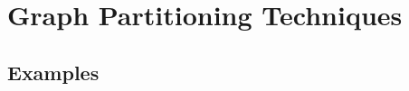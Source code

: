 \section{Graph Partitioning Techniques}
\label{Grelgdnuan_vno_Bleototuh_Lwo_Egerny_BLE}


\subsection{Examples}
\label{Riado_Lyaer_RL}

